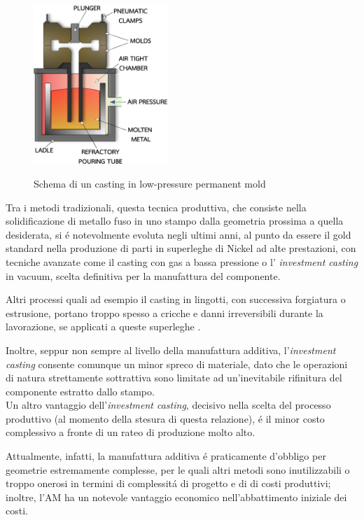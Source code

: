 \documentclass{article}
\begin{document}
    \begin{figure}[h!]
        \centering
         \label{low_press_mold}
        \includegraphics[width=0.45\textwidth]{Sources/pressurized_mold.eps}
        \caption{Schema di un casting in low-pressure permanent mold \autocite{Inkscape}}
    \end{figure}


    Tra i metodi tradizionali, questa tecnica produttiva, che consiste nella solidificazione di metallo fuso
    in uno stampo dalla geometria prossima a quella desiderata, si é notevolmente evoluta negli ultimi anni,
    al punto da essere il gold standard nella
    produzione di parti in superleghe di Nickel ad alte prestazioni, con tecniche avanzate come il casting con
    gas a bassa pressione o l' \textit{investment casting} in vacuum, scelta definitiva per la manufattura del componente. 

    Altri processi quali ad esempio il casting in lingotti, con successiva forgiatura o estrusione,
    portano troppo spesso a cricche e danni irreversibili durante la lavorazione, se applicati a queste superleghe \autocite{Mouritz}.

    Inoltre, seppur non sempre al livello della manufattura additiva, l'\textit{investment casting} consente comunque un minor spreco 
    di materiale, dato che le operazioni di natura strettamente sottrattiva sono limitate ad un'inevitabile
    rifinitura del componente estratto dallo stampo. \\ 

    Un altro vantaggio dell'\textit{investment casting}, decisivo nella scelta del processo
    produttivo (al momento della stesura di questa relazione), é il minor costo complessivo a fronte
    di un rateo di produzione molto alto. 

    Attualmente, infatti, la manufattura additiva é praticamente d'obbligo per geometrie estremamente complesse, 
    per le quali altri metodi sono inutilizzabili o troppo onerosi in termini di complessitá di progetto e di  
    di costi produttivi; inoltre, l'AM ha un notevole vantaggio economico nell'abbattimento iniziale dei costi.
\end{document}
